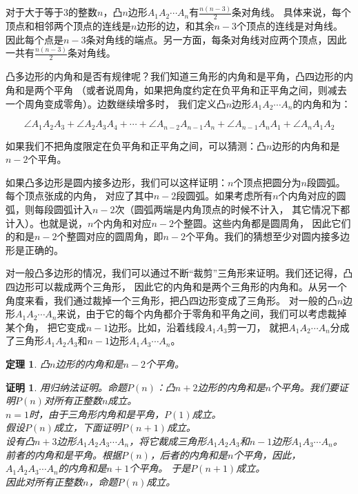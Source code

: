 \documentclass[12pt,UTF8]{ctexbook}
\newtheorem{tm}{定理}[section]
\newtheorem*{proof2}{证明}
\begin{document}
对于大于等于$3$的整数$n$，凸$n$边形$A_1A_2\cdots A_n$有$\frac{n(n-3)}{2}$条对角线。
具体来说，每个顶点和相邻两个顶点的连线是$n$边形的边，和其余$n-3$个顶点的连线是对角线。
因此每个点是$n-3$条对角线的端点。另一方面，每条对角线对应两个顶点，因此一共有$\frac{n(n-3)}{2}$条对角线。

凸多边形的内角和是否有规律呢？我们知道三角形的内角和是平角，凸四边形的内角和是两个平角
（或者说周角，如果把角度约定在负平角和正平角之间，则减去一个周角变成零角）。边数继续增多时，
我们定义凸$n$边形$A_1A_2\cdots A_n$的内角和为：

$$ \angle A_1A_2A_3 + \angle A_2A_3A_4 + \cdots + \angle A_{n-2}A_{n-1}A_{n} + \angle A_{n-1}A_{n}A_{1}+ \angle A_{n}A_{1}A_{2}$$

如果我们不把角度限定在负平角和正平角之间，可以猜测：凸$n$边形的内角和是$n-2$个平角。

如果凸多边形是圆内接多边形，我们可以这样证明：$n$个顶点把圆分为$n$段圆弧。每个顶点张成的内角，
对应了其中$n-2$段圆弧。如果考虑所有$n$个内角对应的圆弧，则每段圆弧计入$n-2$次（圆弧两端是内角顶点的时候不计入，
其它情况下都计入）。也就是说，$n$个内角和对应$n-2$个整圆。这些内角都是圆周角，
因此它们的和是$n-2$个整圆对应的圆周角，即$n-2$个平角。我们的猜想至少对圆内接多边形是正确的。

对一般凸多边形的情况，我们可以通过不断“裁剪”三角形来证明。我们还记得，凸四边形可以裁成两个三角形，
因此它的内角和是两个三角形的内角和。从另一个角度来看，我们通过裁掉一个三角形，把凸四边形变成了三角形。
对一般的凸$n$边形$A_1A_2\cdots A_n$来说，由于它的每个内角都介于零角和平角之间，我们可以考虑裁掉某个角，
把它变成$n-1$边形。比如，沿着线段$A_1A_3$剪一刀，
就把$A_1A_2\cdots A_n$分成了三角形$A_1A_2A_3$和$n-1$边形$A_1A_3\cdots A_n$。

\begin{tm}\label{tm:0-4-0}
    凸$n$边形的内角和是$n-2$个平角。
\end{tm}
\begin{proof2}
    用归纳法证明。命题$P(n)$：凸$n+2$边形的内角和是$n$个平角。我们要证明$P(n)$对所有正整数$n$成立。\\
    $n=1$时，由于三角形内角和是平角，$P(1)$成立。\\
    假设$P(n)$成立，下面证明$P(n+1)$成立。\\
    设有凸$n+3$边形$A_1A_2A_3\cdots A_n$，将它裁成三角形$A_1A_2A_3$和$n-1$边形$A_1A_3\cdots A_n$。
    前者的内角和是平角。根据$P(n)$，后者的内角和是$n$个平角，因此，$A_1A_2A_3\cdots A_n$的内角和是$n+1$个平角。
    于是$P(n+1)$成立。\\
    因此对所有正整数$n$，命题$P(n)$成立。
\end{proof2}
\end{document}
